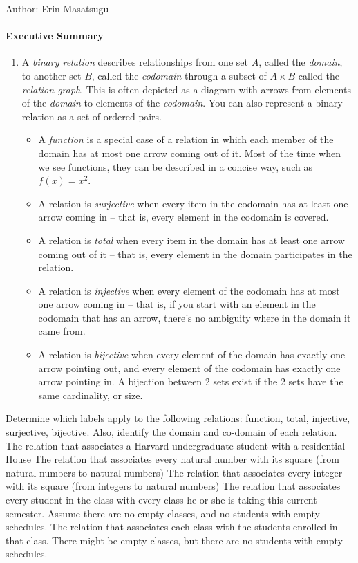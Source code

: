 \documentclass[solution, letterpaper]{cs20inclass}
\begin{document}

\noindent Author: Erin Masatsugu

\paragraph*{Executive Summary}
\begin{enumerate}
\item A {\em binary relation} describes relationships from one set $A$, called the {\em domain}, to another set $B$, called the {\em codomain} through a subset of $A \times B$ called the {\em relation graph}.  This is often depicted as a diagram with arrows from elements of the {\em domain} to elements of the {\em codomain}. You can also represent a binary relation as a set of ordered pairs.
\begin{itemize}
\item A {\em function} is a special case of a relation in which each member of the domain has at most one arrow coming out of it.  Most of the time when we see functions, they can be described in a concise way, such as $f(x) = x^2$.
\item A relation is {\em surjective} when every item in the codomain has at least one arrow coming in -- that is, every element in the codomain is covered.
\item A relation is {\em total} when every item in the domain has at least one arrow coming out of it -- that is, every element in the domain participates in the relation.
\item A relation is {\em injective} when every element of the codomain has at most one arrow coming in -- that is, if you start with an element in the codomain that has an arrow, there's no ambiguity where in the domain it came from.
\item A relation is {\em bijective} when every element of the domain has exactly one arrow pointing out, and every element of the codomain has exactly one arrow pointing in. A bijection between 2 sets exist if the 2 sets have the same cardinality, or size.
\end{itemize}
\end{enumerate}

\problem Determine which labels apply to the following relations: function, total, injective, surjective, bijective. Also, identify the domain and co-domain of each relation.
\subproblem The relation that associates a Harvard undergraduate student with a residential House
\subproblem The relation that associates every natural number with its square (from natural numbers to natural numbers)
\subproblem The relation that associates every integer with its square (from integers to natural numbers)
\subproblem The relation that associates every student in the class with every class he or she is taking this current semester. Assume there are no empty classes, and no students with empty schedules.
\subproblem The relation that associates each class with the students enrolled in that class. There might be empty classes, but there are no students with empty schedules.
\end{document}
